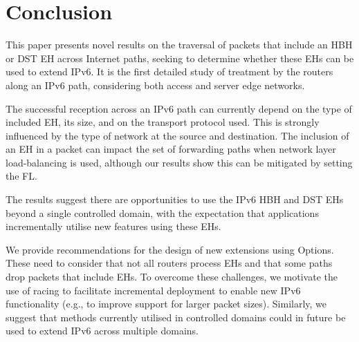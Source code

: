 \documentclass[conference]{IEEEtran}
\begin{document}
 
\section{Conclusion}
\label{sec:conclusion}

This paper presents novel results on the traversal of packets that include an HBH or DST EH across Internet paths, seeking to determine whether these EHs can be used to extend IPv6. It is the first detailed study of treatment by the routers along an IPv6 path, considering both access and server edge networks.

The successful reception across an IPv6 path can currently depend on the type of included EH, its size, and on the transport protocol used. This is
strongly influenced by the type of network at the source and destination.
The inclusion of an EH in a packet can impact the set of forwarding paths when network layer load-balancing is used, although our results show this can be mitigated by setting the FL.

The results suggest there are opportunities to use the IPv6 HBH and DST EHs beyond a single controlled domain, with the expectation that applications incrementally utilise new features using these EHs. 

We provide recommendations for the design of new extensions using Options. These need to consider that not all routers process EHs and that some paths drop packets that include EHs. To overcome these challenges, we motivate the use of racing to facilitate incremental deployment to enable new IPv6 functionality (e.g., to improve support for larger packet sizes). Similarly, we suggest that methods currently utilised in controlled domains could in future be used to extend IPv6 across multiple domains.
\end{document}
